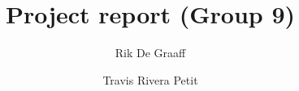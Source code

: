 \title{Project report (Group 9)} %
\author{Rik De Graaff \and Travis Rivera Petit} %

\institute{\lectureInstitute} %
\begin{report}










\end{report}
